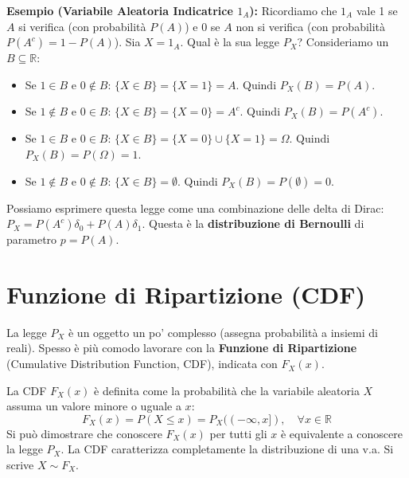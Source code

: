\begin{example}
\textbf{Esempio (Variabile Aleatoria Indicatrice $1_A$):}
Ricordiamo che $1_A$ vale 1 se $A$ si verifica (con probabilità $P(A)$) e 0 se $A$ non si verifica (con probabilità $P(A^c) = 1-P(A)$).
Sia $X = 1_A$. Qual è la sua legge $P_X$?
Consideriamo un $B \subseteq \mathbb{R}$:
\begin{itemize}
    \item Se $1 \in B$ e $0 \notin B$: $\{X \in B\} = \{X=1\} = A$. Quindi $P_X(B) = P(A)$.
    \item Se $1 \notin B$ e $0 \in B$: $\{X \in B\} = \{X=0\} = A^c$. Quindi $P_X(B) = P(A^c)$.
    \item Se $1 \in B$ e $0 \in B$: $\{X \in B\} = \{X=0\} \cup \{X=1\} = \Omega$. Quindi $P_X(B) = P(\Omega) = 1$.
    \item Se $1 \notin B$ e $0 \notin B$: $\{X \in B\} = \emptyset$. Quindi $P_X(B) = P(\emptyset) = 0$.
\end{itemize}
Possiamo esprimere questa legge come una combinazione delle delta di Dirac:
$P_X = P(A^c) \delta_0 + P(A) \delta_1$.
Questa è la \textbf{distribuzione di Bernoulli} di parametro $p=P(A)$.
\end{example}

\section{Funzione di Ripartizione (CDF)}
La legge $P_X$ è un oggetto un po' complesso (assegna probabilità a insiemi di reali). Spesso è più comodo lavorare con la \textbf{Funzione di Ripartizione} (Cumulative Distribution Function, CDF), indicata con $F_X(x)$.

\begin{definition}
La CDF $F_X(x)$ è definita come la probabilità che la variabile aleatoria $X$ assuma un valore minore o uguale a $x$:
\[ F_X(x) = P(X \le x) = P_X((-\infty, x]), \quad \forall x \in \mathbb{R} \]
Si può dimostrare che conoscere $F_X(x)$ per tutti gli $x$ è equivalente a conoscere la legge $P_X$. La CDF caratterizza completamente la distribuzione di una v.a. Si scrive $X \sim F_X$.
\end{definition}

